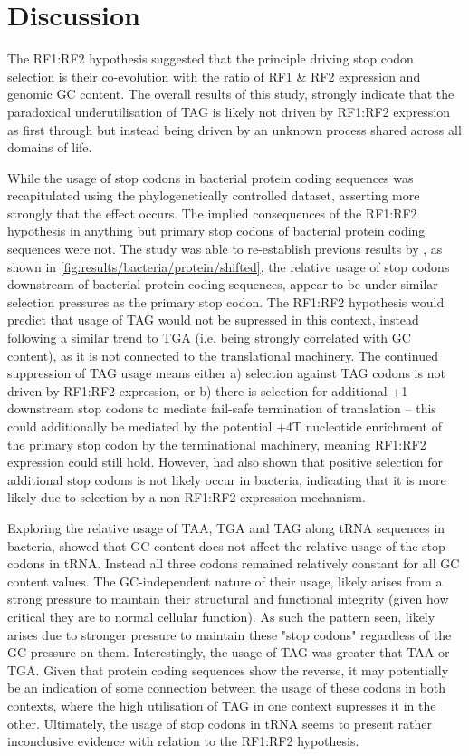\documentclass[../main.tex]{subfile}
\begin{document}
 \section{Discussion}
    The RF1:RF2 hypothesis suggested that the principle driving stop codon selection is their co-evolution with the  ratio of RF1 \& RF2 expression and genomic GC content. The overall results of this study, strongly indicate that the paradoxical underutilisation of TAG is likely not driven by RF1:RF2 expression as first through but instead being driven by an unknown process shared across all domains of life.

    While the usage of stop codons in bacterial protein coding sequences was recapitulated using the phylogenetically controlled dataset, asserting more strongly that the effect occurs. The implied consequences of the RF1:RF2 hypothesis in anything but primary stop codons of bacterial protein coding sequences were not.
    The study was able to re-establish previous results by \textcite{Ho2019}, as shown in \cref{fig:results/bacteria/protein/shifted}, the relative usage of stop codons downstream of bacterial protein coding sequences, appear to be under similar selection pressures as the primary stop codon. The RF1:RF2 hypothesis would predict that usage of TAG would not be supressed in this context, instead following a similar trend to TGA (i.e. being strongly correlated with GC content), as it is not connected to the translational machinery.
    The continued suppression of TAG usage means either a) selection against TAG codons is not driven by RF1:RF2 expression, or b) there is selection for additional +1 downstream stop codons to mediate fail-safe termination of translation -- this could additionally be mediated by the potential +4T nucleotide enrichment of the primary stop codon \autocite{Ho2019} by the terminational machinery, meaning RF1:RF2 expression could still hold. However, \textcite{Ho2019} had also shown that positive selection for additional stop codons is not likely occur in bacteria, indicating that it is more likely due to selection by a non-RF1:RF2 expression mechanism.

    Exploring the relative usage of TAA, TGA and TAG along tRNA sequences in bacteria, showed that GC content does not affect the relative usage of the stop codons in tRNA. Instead all three codons remained relatively constant for all GC content values. The GC-independent nature of their usage, likely arises from a strong pressure to maintain their structural and functional integrity (given how critical they are to normal cellular function). As such the pattern seen, likely arises due to stronger pressure to maintain these "stop codons" regardless of the GC pressure on them. Interestingly, the usage of TAG was greater that TAA or TGA. Given that protein coding sequences show the reverse, it may potentially be an indication of some connection between the usage of these codons in both contexts, where the high utilisation of TAG in one context supresses it in the other. Ultimately, the usage of stop codons in tRNA seems to present rather inconclusive evidence with relation to the RF1:RF2 hypothesis.
\end{document}
